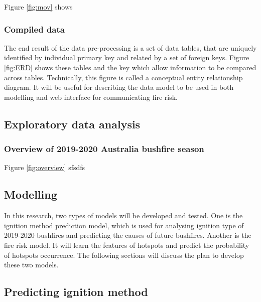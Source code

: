 \documentclass[11pt,a4paper,]{article}
\begin{document}
Figure \ref{fig:mov} shows

\hypertarget{compiled-data}{%
\subsubsection{Compiled data}\label{compiled-data}}

The end result of the data pre-processing is a set of data tables, that are uniquely identified by individual primary key and related by a set of foreign keys. Figure \ref{fig:ERD} shows these tables and the key which allow information to be compared across tables. Technically, this figure is called a conceptual entity relationship diagram. It will be useful for describing the data model to be used in both modelling and web interface for communicating fire risk.

\hypertarget{exploratory-data-analysis}{%
\subsection{Exploratory data analysis}\label{exploratory-data-analysis}}

\hypertarget{overview-of-2019-2020-australia-bushfire-season}{%
\subsubsection{Overview of 2019-2020 Australia bushfire season}\label{overview-of-2019-2020-australia-bushfire-season}}

Figure \ref{fig:overview} sfsdfs

\hypertarget{modelling}{%
\subsection{Modelling}\label{modelling}}

In this research, two types of models will be developed and tested. One is the ignition method prediction model, which is used for analysing ignition type of 2019-2020 bushfires and predicting the causes of future bushfires. Another is the fire risk model. It will learn the features of hotspots and predict the probability of hotspots occurrence. The following sections will discuss the plan to develop these two models.

\hypertarget{predicting-ignition-method}{%
\subsection{Predicting ignition method}\label{predicting-ignition-method}}
\end{document}
